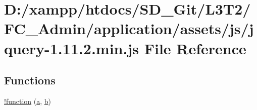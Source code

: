 \hypertarget{application_2assets_2js_2jquery-1_811_82_8min_8js}{}\section{D\+:/xampp/htdocs/\+S\+D\+\_\+\+Git/\+L3\+T2/\+F\+C\+\_\+\+Admin/application/assets/js/jquery-\/1.11.2.min.\+js File Reference}
\label{application_2assets_2js_2jquery-1_811_82_8min_8js}
\subsection*{Functions}
\begin{DoxyCompactItemize}
\item 
\hyperlink{application_2assets_2js_2jquery-1_811_82_8min_8js_a43f0b96ea8ec44ca20ba86809a785614}{!function} (\hyperlink{assets_2js_2bootstrap_8min_8js_a1f5870dcf487187f13d5fd328ed9e6e7}{a}, \hyperlink{assets_2js_2bootstrap_8min_8js_a398bb8542498d1b14178b02b99df309b}{b})
\item 

\end{DoxyCompactItemize}
